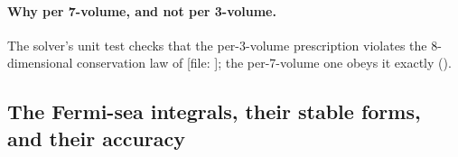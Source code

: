 \paragraph{Why per 7-volume, and not per 3-volume.} The solver's unit test
 checks that the per-3-volume
prescription violates the 8-dimensional conservation law of  [file:
]; the per-7-volume one obeys it exactly
().

\subsection{The Fermi-sea integrals, their stable forms, and their accuracy}
\label{sec:7.2}

